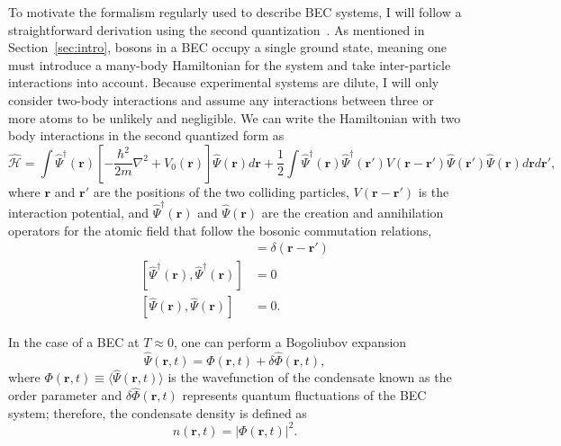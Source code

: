 To motivate the formalism regularly used to describe BEC systems, I will follow a straightforward derivation using the second quantization~\cite{aversa2008}.
As mentioned in Section~\ref{sec:intro}, bosons in a BEC occupy a single ground state, meaning one must introduce a many-body Hamiltonian for the system and take inter-particle interactions into account.
Because experimental systems are dilute, I will only consider two-body interactions and assume any interactions between three or more atoms to be unlikely and negligible.
We can write the Hamiltonian with two body interactions in the second quantized form as
\begin{equation}
    \mathcal{\hat H} = \int \hat \Psi^\dagger(\mathbf{r})\left[-\frac{\hbar^2}{2m}\nabla^2 + V_0(\mathbf{r}) \right]\hat \Psi(\mathbf{r}) d\mathbf{r} + \frac{1}{2} \int  \hat \Psi^\dagger(\mathbf{r}) \hat \Psi^\dagger(\mathbf{r'}) V(\mathbf{r} - \mathbf{r'})\hat \Psi(\mathbf{r'}) \hat \Psi(\mathbf{r}) d\mathbf{r} d\mathbf{r'},
    \label{eqn:2nd}
\end{equation}
where $\mathbf{r}$ and $\mathbf{r'}$ are the positions of the two colliding particles, $V(\mathbf{r}-\mathbf{r'})$ is the interaction potential, and $\hat \Psi^\dagger(\mathbf{r})$ and $\hat \Psi(\mathbf{r})$ are the creation and annihilation operators for the atomic field that follow the bosonic commutation relations,
\begin{align}
 [\hat \Psi(\mathbf{r}),\hat \Psi^\dagger(\mathbf{r})] &= \delta(\mathbf{r} - \mathbf{r'}) \\
 [\hat \Psi^\dagger(\mathbf{r}),\hat \Psi^\dagger(\mathbf{r})] &= 0 \\
 [\hat \Psi(\mathbf{r}),\hat \Psi(\mathbf{r})] &= 0.
\end{align}

\noindent In the case of a BEC at $T\approx0$, one can perform a Bogoliubov expansion~\cite{bogoliubov1947, dalfovo1999}
\begin{equation}
    \hat \Psi (\mathbf{r}, t) = \Phi(\mathbf{r},t) + \delta \hat \Phi(\mathbf{r},t),
\label{eqn:bog1}
\end{equation}
where $\Phi(\mathbf{r},t) \equiv \langle \hat \Psi(\mathbf{r},t) \rangle$ is the wavefunction of the condensate known as the order parameter and $\delta \hat \Phi(\mathbf{r},t)$ represents quantum fluctuations of the BEC system;
therefore, the condensate density is defined as
\begin{equation}
    n(\mathbf{r},t) = |\Phi(\mathbf{r},t)|^2.
\end{equation}

